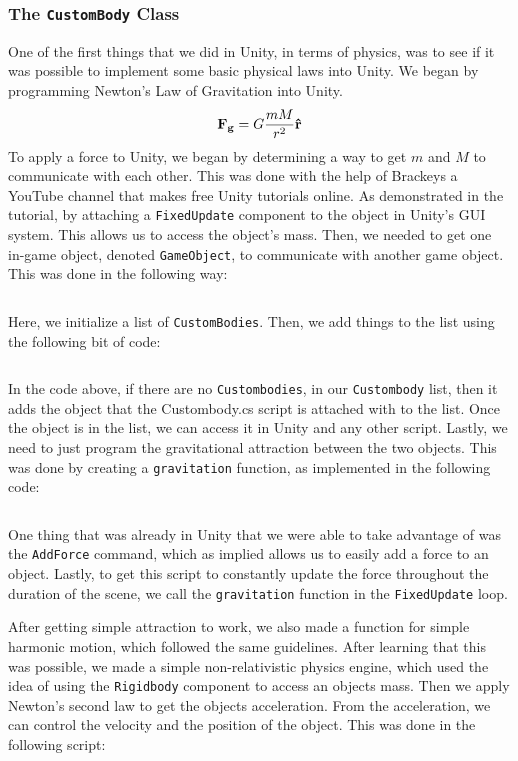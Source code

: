 \documentclass[12pt]{article}
\renewcommand{\vec}[1]{\boldsymbol{\mathbf{#1}}}
\begin{document}
\subsubsection{The \texttt{CustomBody} Class}
One of the first things that we did in Unity, in terms of physics, was to see if it was possible to implement some basic physical laws into Unity. We began by programming Newton's Law of Gravitation into Unity. 
\begin{equation}
	\vec{F_g} = G\frac{m M}{r^2}\vu{r}
\end{equation}
To apply a force to Unity, we began by determining a way to get $m$ and $M$ to communicate with each other. This was done with the help of Brackeys a YouTube channel that makes free Unity tutorials online. As demonstrated in the tutorial, by attaching a \texttt{FixedUpdate} component to the object in Unity's GUI system. This allows us to access the object's mass. Then, we needed to get one in-game object, denoted \texttt{GameObject}, to communicate with another game object. This was done in the following way:
\inputminted[firstline=7,lastline=8,linenos,fontsize=\footnotesize,bgcolor=codebg]{csharp}{../unity/Assets/Scripts/Engine/CustomBody.cs}
Here, we initialize a list of \texttt{CustomBodies}. Then, we add things to the list using the following bit of code:
\inputminted[firstline=26,lastline=36,linenos,fontsize=\footnotesize,bgcolor=codebg]{csharp}{../unity/Assets/Scripts/Engine/CustomBody.cs}
In the code above, if there are no \texttt{Custombodies}, in our \texttt{Custombody} list, then it adds the object that the Custombody.cs script is attached with to the list. Once the object is in the list, we can access it in Unity and any other script. Lastly, we need to just program the gravitational attraction between the two objects. This was done by creating a \texttt{gravitation} function, as implemented in the following code:
\inputminted[firstline=39,lastline=73,linenos,fontsize=\footnotesize,bgcolor=codebg]{csharp}{../unity/Assets/Scripts/Engine/CustomBody.cs}
One thing that was already in Unity that we were able to take advantage of was the \texttt{AddForce} command, which as implied allows us to easily add a force to an object. Lastly, to get this script to constantly update the force throughout the duration of the scene, we call the \texttt{gravitation} function in the \texttt{FixedUpdate} loop.


After getting simple attraction to work, we also made a function for simple harmonic motion, which followed the same guidelines. After learning that this was possible, we made a simple non-relativistic physics engine, which used the idea of using the \texttt{Rigidbody} component to access an objects mass. Then we apply Newton's second law to get the objects acceleration. From the acceleration, we can control the velocity and the position of the object. This was done in the following script: 
\end{document}
